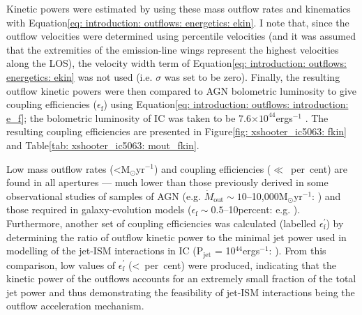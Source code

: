 Kinetic powers were estimated by using these mass outflow rates and kinematics with Equation\;\ref{eq: introduction: outflows: energetics: ekin}. I note that, since the outflow velocities were determined using percentile velocities (and it was assumed that the extremities of the emission-line wings represent the highest velocities along the LOS), the velocity width term of Equation\;\ref{eq: introduction: outflows: energetics: ekin} was not used (i.e. $\sigma$ was set to be zero). Finally, the resulting outflow kinetic powers were then compared to AGN bolometric luminosity to give coupling efficiencies ($\epsilon_\mathrm{f}$) using Equation\;\ref{eq: introduction: outflows: introduction: e_f}; the bolometric luminosity of IC was taken to be 7.6$\times 10^{44}$\;erg\;s$^{-1}$ \citep{Nicastro2003, Morganti2007}. The resulting coupling efficiencies are presented in Figure\;\ref{fig: xshooter_ic5063: fkin} and Table\;\ref{tab: xshooter_ic5063: mout_fkin}. 

Low mass outflow rates (\mbox{\textless{}\;M$_\odot$\;yr$^{-1}$}) and coupling efficiencies (\mbox{$\ll$ per cent}) are found in all apertures --- much lower than those previously derived in some observational studies of samples of AGN (e.g. $\dot{M}_\mathrm{out}\sim10$--10,000\;M$_\odot$yr$^{-1}$: \citealt{Fiore2017}) and those required in galaxy-evolution models ($\epsilon_\mathrm{f}\sim0.5$--10\;per\;cent: e.g. \citealt{DiMatteo2005, Hopkins2010}). Furthermore, another set of coupling efficiencies was calculated (labelled $\epsilon_\mathrm{f}^{\prime}$) by determining the ratio of outflow kinetic power to the minimal jet power used in modelling of the jet-ISM interactions in IC (P$_\mathrm{jet}$ = 10$^{44}$\;erg\;s$^{-1}$: \citealt{Mukherjee2018}). From this comparison, low values of $\epsilon_\mathrm{f}^{\prime}$ (\mbox{\textless{} per cent}) were produced, indicating that the kinetic power of the outflows accounts for an extremely small fraction of the total jet power and thus demonstrating the feasibility of jet-ISM interactions being the outflow acceleration mechanism.


